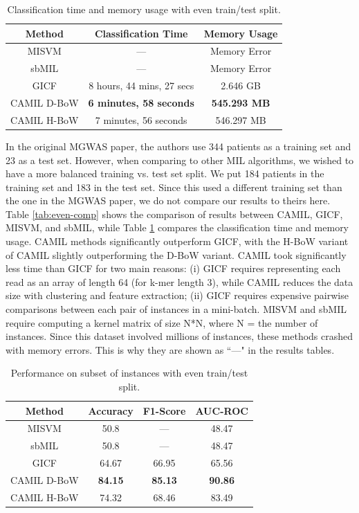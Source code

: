 \begin{table}[h]
\begin{center}
\caption{Classification time and memory usage with even train/test split.} 
\label{tab:time-comp}
\begin{tabular}{|c|cc|}\hline
Method & Classification Time & Memory Usage\\\hline
MISVM & --- & Memory Error\\\hline
sbMIL & --- & Memory Error\\\hline
GICF & 8 hours, 44 mins, 27 secs & 2.646 GB\\\hline
CAMIL D-BoW & \bf{6 minutes, 58 seconds} & \bf{545.293 MB}\\\hline
CAMIL H-BoW & 7 minutes, 56 seconds & 546.297 MB\\\hline
\end{tabular}
\end{center}
\end{table}

In the original MGWAS paper, the authors use 344 patients as a training set and 23 as a test set. However, when comparing to other MIL algorithms, we wished to have a more balanced training vs. test set split. We put 184 patients in the training set and 183 in the test set. Since this used a different training set than the one in the MGWAS paper, we do not compare our results to theirs here. Table \ref{tab:even-comp} shows the comparison of results between CAMIL, GICF, MISVM, and sbMIL, while Table \ref{tab:time-comp} compares the classification time and memory usage. CAMIL methods significantly outperform GICF, with the H-BoW variant of CAMIL slightly outperforming the D-BoW variant. CAMIL took significantly less time than GICF for two main reasons: (i) GICF requires representing each read as an array of length 64 (for k-mer length 3), while CAMIL reduces the data size with clustering and feature extraction; (ii) GICF requires expensive pairwise comparisons between each pair of instances in a mini-batch. MISVM and sbMIL require computing a kernel matrix of size N*N, where N = the number of instances. Since this dataset involved millions of instances, these methods crashed with memory errors. This is why they are shown as ``---" in the results tables.

\begin{table}[h]
\begin{center}
\caption{Performance on subset of instances with even train/test split.}
\label{tab:subset-comp}
\begin{tabular}{|c|ccc|}\hline
Method & Accuracy & F1-Score & AUC-ROC\\\hline
MISVM & 50.8 & --- & 48.47\\\hline
sbMIL & 50.8 & --- & 48.47\\\hline
GICF & 64.67 & 66.95 & 65.56\\\hline
CAMIL D-BoW & \bf{84.15} & \bf{85.13} & \bf{90.86}\\\hline
CAMIL H-BoW & 74.32 & 68.46 & 83.49\\\hline
\end{tabular}
\end{center}
\end{table}

